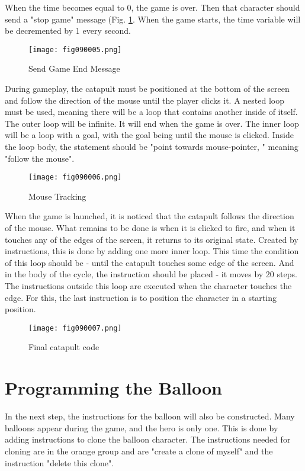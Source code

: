 When the time becomes equal to 0, the game is over. Then that character should send a "stop game" message (Fig. \ref{fig090005}. When the game starts, the time variable will be decremented by 1 every second.

\begin{figure}[H]
   \centering
   \texttt{[image: fig090005.png]}
   \caption{Send Game End Message}
\label{fig090005}
\end{figure}

During gameplay, the catapult must be positioned at the bottom of the screen and follow the direction of the mouse until the player clicks it. A nested loop must be used, meaning there will be a loop that contains another inside of itself. The outer loop will be infinite. It will end when the game is over. The inner loop will be a loop with a goal, with the goal being until the mouse is clicked. Inside the loop body, the statement should be "point towards mouse-pointer, " meaning "follow the mouse".
 
\begin{figure}[H]
   \centering
   \texttt{[image: fig090006.png]}
   \caption{Mouse Tracking}
\label{fig090006}
\end{figure}

When the game is launched, it is noticed that the catapult follows the direction of the mouse. What remains to be done is when it is clicked to fire, and when it touches any of the edges of the screen, it returns to its original state. Created by instructions, this is done by adding one more inner loop. This time the condition of this loop should be - until the catapult touches some edge of the screen. And in the body of the cycle, the instruction should be placed - it moves by 20 steps. The instructions outside this loop are executed when the character touches the edge. For this, the last instruction is to position the character in a starting position.

\begin{figure}[H]
   \centering
   \texttt{[image: fig090007.png]}
   \caption{Final catapult code}
\label{fig090007}
\end{figure}

\section{Programming the Balloon}
In the next step, the instructions for the balloon will also be constructed. Many balloons appear during the game, and the hero is only one. This is done by adding instructions to clone the balloon character. The instructions needed for cloning are in the orange group and are "create a clone of myself" and the instruction "delete this clone".

